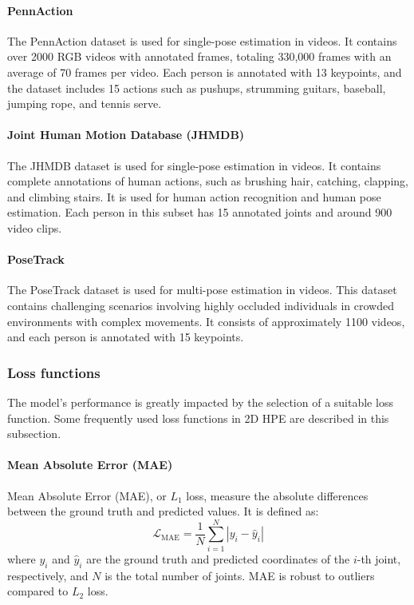 \paragraph{PennAction}
The PennAction dataset \cite{zhang2013actemes} is used for single-pose estimation in videos. It contains over 2000 RGB videos with annotated frames, totaling 330,000 frames with an average of 
70 frames per video. Each person is annotated with 13 keypoints, and the dataset includes 15 actions such as pushups, strumming guitars, baseball, jumping rope, and
tennis serve.

\paragraph{Joint Human Motion Database (JHMDB)}
The JHMDB dataset \cite{jhuang2013towards} is used for single-pose estimation in videos. It contains complete annotations of human actions, such as brushing hair, catching, clapping, and climbing
stairs. It is used for human action recognition and human pose estimation. Each person in this subset has 15 annotated joints and around 900 video clips.

\paragraph{PoseTrack}
The PoseTrack dataset \cite{andriluka2018posetrack} is used for multi-pose estimation in videos. This dataset contains challenging scenarios involving highly occluded individuals in crowded environments
with complex movements. It consists of approximately 1100 videos, and each person is annotated with 15 keypoints.


\subsubsection{Loss functions}
The model's performance is greatly impacted by the selection of a suitable loss function. Some frequently used loss functions in 2D HPE are described in this subsection.

\paragraph{Mean Absolute Error (MAE)}
Mean Absolute Error (MAE), or $L_1$ loss, measure the absolute differences between the ground truth and predicted values. It is defined as:
\begin{equation}
    \mathcal{L}_{\text{MAE}} = \frac{1}{N} \sum_{i=1}^{N} |y_i - \hat{y}_i|
\end{equation}
where $y_i$ and $\hat{y}_i$ are the ground truth and predicted coordinates of the $i$-th joint, respectively, and $N$ is the total number of joints. MAE is robust to outliers compared to $L_2$ loss.

